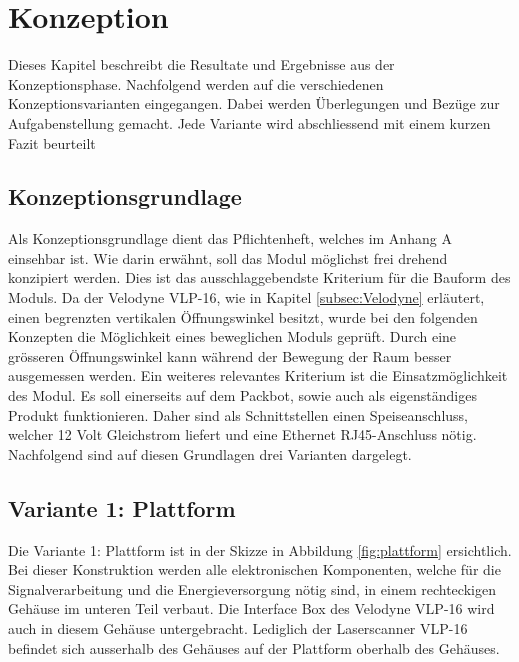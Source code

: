 \chapter{Konzeption}
\label{chap:Konzeption}

Dieses Kapitel beschreibt die Resultate und Ergebnisse aus der Konzeptionsphase. Nachfolgend werden auf die verschiedenen Konzeptionsvarianten eingegangen. Dabei werden Überlegungen und Bezüge zur Aufgabenstellung gemacht. Jede Variante wird abschliessend mit einem kurzen Fazit beurteilt

\section{Konzeptionsgrundlage}
\label{sec:Konzeptiongrund}
Als Konzeptionsgrundlage dient das Pflichtenheft, welches im Anhang A einsehbar ist. Wie darin erwähnt, soll das Modul möglichst frei drehend konzipiert werden. Dies ist das ausschlaggebendste Kriterium für die Bauform des Moduls. Da der Velodyne VLP-16, wie in Kapitel \ref{subsec:Velodyne} erläutert, einen begrenzten vertikalen Öffnungswinkel besitzt, wurde bei den folgenden Konzepten die Möglichkeit eines beweglichen Moduls geprüft. Durch eine grösseren Öffnungswinkel kann während der Bewegung der Raum besser ausgemessen werden. Ein weiteres relevantes Kriterium ist die Einsatzmöglichkeit des Modul. Es soll einerseits auf dem Packbot, sowie auch als eigenständiges Produkt funktionieren. Daher sind als Schnittstellen einen Speiseanschluss, welcher 12 Volt Gleichstrom liefert und eine Ethernet RJ45-Anschluss nötig. Nachfolgend sind auf diesen Grundlagen drei Varianten dargelegt.

\section {Variante 1: Plattform}
\label{sec:var1}
Die Variante 1: Plattform ist in der Skizze in Abbildung \ref{fig:plattform} ersichtlich. Bei dieser Konstruktion werden alle elektronischen Komponenten, welche für die Signalverarbeitung und die Energieversorgung nötig sind, in einem rechteckigen Gehäuse im unteren Teil verbaut. Die Interface Box des Velodyne VLP-16 wird auch in diesem Gehäuse untergebracht. Lediglich der Laserscanner VLP-16 befindet sich ausserhalb des Gehäuses auf der Plattform oberhalb des Gehäuses.

